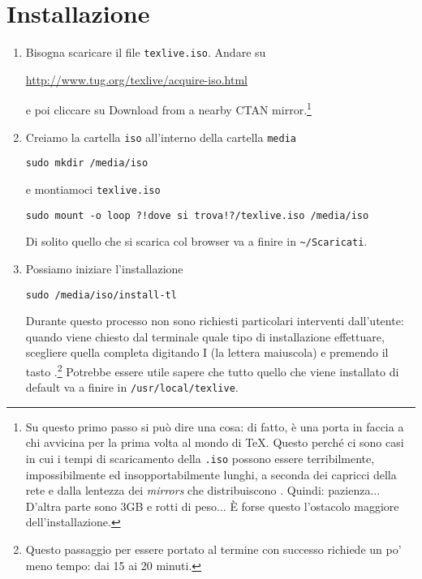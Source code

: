 
\section{Installazione}

\begin{enumerate}

\item Bisogna scaricare il file \lstinline£texlive.iso£. Andare su
\begin{center}
\url{http://www.tug.org/texlive/acquire-iso.html}
\end{center}
e poi cliccare su {\sf Download from a nearby CTAN mirror}.\footnote{Su questo primo passo si può dire una cosa: di fatto, è una porta in faccia a chi avvicina per la prima volta al mondo di \TeX{}. Questo perché ci sono casi in cui i tempi di scaricamento della \lstinline£.iso£ possono essere terribilmente, impossibilmente ed insopportabilmente lunghi, a seconda dei capricci della rete e dalla lentezza dei {\em mirrors} che distribuiscono \texlive{}. Quindi: pazienza... D'altra parte sono 3GB e rotti di peso... È forse questo l'ostacolo maggiore dell'installazione.}

\item Creiamo la cartella \lstinline£iso£ all'interno della cartella \lstinline£media£
\begin{lstlisting}
sudo mkdir /media/iso
\end{lstlisting}
e montiamoci \lstinline£texlive.iso£
\begin{lstlisting}
sudo mount -o loop ?!dove si trova!?/texlive.iso /media/iso
\end{lstlisting}
Di solito quello che si scarica col browser va a finire in \lstinline£~/Scaricati£.

\item Possiamo iniziare l'installazione
\begin{lstlisting}
sudo /media/iso/install-tl
\end{lstlisting}
Durante questo processo non sono richiesti particolari interventi dall'utente: quando viene chiesto dal terminale quale tipo di installazione effettuare, scegliere quella completa digitando {\sf I} (la lettera  maiuscola) e premendo il tasto \invio{}.\footnote{Questo passaggio per essere portato al termine con successo richiede un po' meno tempo: dai 15 ai 20 minuti.} Potrebbe essere utile sapere che tutto quello che viene installato di default va a finire in \lstinline£/usr/local/texlive£.


\end{enumerate}

